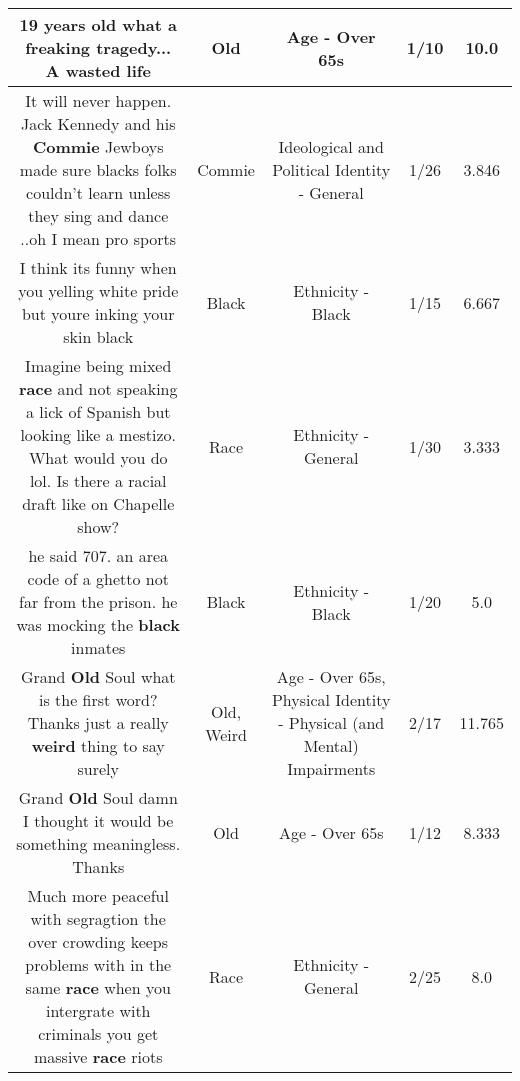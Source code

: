 \documentclass[11pt]{article}
\newlength\mylength
\begin{document}
\begin{center}
\begin{longtable}{|C{.65\mylength}|C{.30\mylength}|C{.12\mylength}|C{.12\mylength}|C{.12\mylength}|}
  \small 19 years \textbf{old} what a freaking tragedy... A wasted life\normalsize   & Old & Age - Over 65s & 1/10 & 10.0 \\  \hline
  \small It will never happen. Jack Kennedy and his \textbf{Commie} Jewboys made sure blacks folks couldn't learn unless they sing and dance ..oh I mean pro sports\normalsize   & Commie &  Ideological and Political Identity - General & 1/26 & 3.846 \\  \hline
  \small I think its funny when you yelling white pride but youre inking your skin black\normalsize   & Black & Ethnicity - Black & 1/15 & 6.667 \\  \hline
  \small Imagine being mixed \textbf{race} and not speaking a lick of Spanish but looking like a mestizo. What would you do lol. Is there a racial draft like on Chapelle show?\normalsize   & Race & Ethnicity - General & 1/30 & 3.333 \\  \hline
  \small he said 707. an area code of a ghetto not far from the prison. he was mocking the \textbf{black} inmates\normalsize   & Black & Ethnicity - Black & 1/20 & 5.0 \\  \hline
  \small Grand \textbf{Old} Soul what is the first word? Thanks just a really \textbf{weird} thing to say surely\normalsize   & Old, Weird & Age - Over 65s, Physical Identity - Physical (and Mental) Impairments & 2/17 & 11.765 \\  \hline
  \small Grand \textbf{Old} Soul damn I thought it would be something meaningless. Thanks\normalsize   & Old & Age - Over 65s & 1/12 & 8.333 \\  \hline
  \small Much more peaceful with segragtion the over crowding keeps problems with in the same \textbf{race} when you intergrate with criminals you get massive \textbf{race} riots\normalsize   & Race & Ethnicity - General & 2/25 & 8.0 \\  \hline

\end{longtable}
\end{center}
\end{document}
